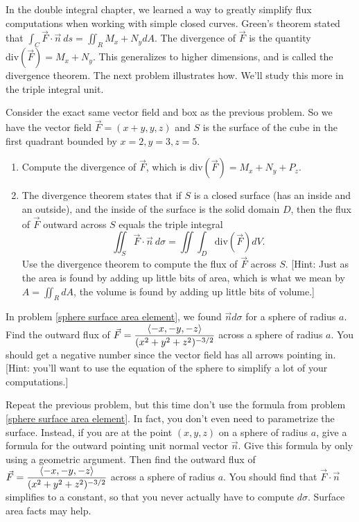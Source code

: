 In the double integral chapter, we learned a way to greatly simplify flux computations when working with simple closed curves.  Green's theorem stated that $\int_C \vec F\cdot \vec n\ ds = \iint_R M_x+N_y dA$.  The divergence of $\vec F$ is the quantity $\text{div}(\vec F) = M_x+N_y$.  This generalizes to higher dimensions, and is called the divergence theorem. The next problem illustrates how.  We'll study this more in the triple integral unit.

\begin{problem}
 Consider the exact same vector field and box as the previous problem.  So  we have the vector field $\vec F=(x+y,y,z) $  and $S$ is the surface of the cube in the first quadrant bounded by {$ x=2,y=3,z=5 $}.
\begin{enumerate}
 \item Compute the divergence of $\vec F$, which is $\text{div}(\vec F) = M_x+N_y+P_z$.
 \item The divergence theorem states that if $S$ is a closed surface (has an inside and an outside), and the inside of the surface is the solid domain $D$, then the flux of $\vec F$ outward across $S$ equals the triple integral
$$\iint_S\vec F\cdot \vec n\ d\sigma = \iint\int_D \text{div}(\vec F)dV.$$
 Use the divergence theorem to compute the flux of $\vec F$ across $S$. [Hint: Just as the area is found by adding up little bits of area, which is what we mean by $A=\iint_R dA$, the volume is found by adding up little bits of volume.] 
\end{enumerate}
\end{problem}


\begin{problem}
In problem \ref{sphere surface area element}, we found $\vec n d\sigma$ for a sphere of radius $a$.  
Find the outward flux of {$\displaystyle \vec F=\frac{\left<-x,-y,-z\right>}{(x^2+y^2+z^2)^{-3/2}} $} across a sphere of radius $a$. You should get a negative number since the vector field has all arrows pointing in. [Hint: you'll want to use the equation of the sphere to simplify a lot of your computations.]

\end{problem}


\begin{problem}
Repeat the previous problem, but this time don't use the formula from problem \ref{sphere surface area element}. In fact, you don't even need to parametrize the surface. Instead, if you are at the point $(x,y,z)$ on a sphere of radius $a$, give a formula for the outward pointing unit normal vector $\vec n$. Give this formula by only using a geometric argument.  Then find the outward flux of {$\displaystyle \vec F=\frac{\left<-x,-y,-z\right>}{(x^2+y^2+z^2)^{-3/2}} $} across a sphere of radius $a$. You should find that $\vec F\cdot \vec n$ simplifies to a constant, so that you never actually have to compute $d\sigma$. Surface area facts may help.

\end{problem}


